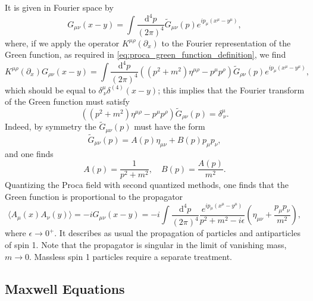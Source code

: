 It is given in Fourier space by
\[
    G_{\mu \nu}(x-y) = \int \frac{\mathrm{d}^4 p}{(2\pi)^4} \tilde{G}_{\mu \nu}(p) e^{i p_\mu (x^\mu - y^\mu)},
\]
where, if we apply the operator \(K^{\mu \rho}(\partial_x)\) to the Fourier representation of the Green function, as required in \eqref{eq:proca_green_function_definition}, we find
\[
    K^{\mu \rho}(\partial_x) G_{\rho \nu}(x-y) = \int \frac{\mathrm{d}^4 p}{(2\pi)^4} \left( (p^2 + m^2) \eta^{\mu \rho} - p^{\mu} p^{\rho} \right) \tilde{G}_{\rho \nu}(p) e^{i p_\mu (x^\mu - y^\mu)},
\]
which should be equal to \(\delta^{\mu}_{\ \nu} \delta^{(4)}(x-y)\); this implies that the Fourier transform of the Green function must satisfy
\[
    \left( (p^2 + m^2) \eta^{\mu \rho} - p^{\mu} p^{\rho} \right) \tilde{G}_{\rho \nu}(p) = \delta^{\mu}_{\ \nu}.
\]
Indeed, by symmetry the \(\tilde{G}_{\mu \nu}(p)\) must have the form
\[
    \tilde{G}_{\mu \nu}(p) = A(p) \eta_{\mu \nu} + B(p) p_\mu p_\nu,
\]
and one finds
\[
    A(p) = \frac{1}{p^2 + m^2}, \quad B(p) = \frac{A(p)}{m^2}.
\]
Quantizing the Proca field with second quantized methods, one finds that the Green function is proportional to the propagator
\[
    \langle A_\mu(x) A_\nu(y) \rangle = -i G_{\mu \nu} (x-y) = -i \int \frac{\mathrm{d}^4 p}{(2\pi)^4} \frac{e^{i p_\mu (x^\mu - y^\mu)}}{p^2 + m^2 - i \epsilon} \left( \eta_{\mu \nu} + \frac{p_\mu p_\nu}{m^2} \right),
\]
where \(\epsilon \to  0^+\). It describes as usual the propagation of particles and antiparticles of spin 1. Note that the propagator is singular in the limit of vanishing mass, \(m \to 0\). Massless spin 1 particles require a separate treatment.

\subsection{Maxwell Equations}


